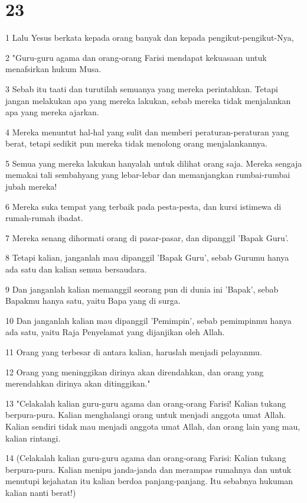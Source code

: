 \chapter{23}

\par 1 Lalu Yesus berkata kepada orang banyak dan kepada pengikut-pengikut-Nya,
\par 2 "Guru-guru agama dan orang-orang Farisi mendapat kekuasaan untuk menafsirkan hukum Musa.
\par 3 Sebab itu taati dan turutilah semuanya yang mereka perintahkan. Tetapi jangan melakukan apa yang mereka lakukan, sebab mereka tidak menjalankan apa yang mereka ajarkan.
\par 4 Mereka menuntut hal-hal yang sulit dan memberi peraturan-peraturan yang berat, tetapi sedikit pun mereka tidak menolong orang menjalankannya.
\par 5 Semua yang mereka lakukan hanyalah untuk dilihat orang saja. Mereka sengaja memakai tali sembahyang yang lebar-lebar dan memanjangkan rumbai-rumbai jubah mereka!
\par 6 Mereka suka tempat yang terbaik pada pesta-pesta, dan kursi istimewa di rumah-rumah ibadat.
\par 7 Mereka senang dihormati orang di pasar-pasar, dan dipanggil 'Bapak Guru'.
\par 8 Tetapi kalian, janganlah mau dipanggil 'Bapak Guru', sebab Gurumu hanya ada satu dan kalian semua bersaudara.
\par 9 Dan janganlah kalian memanggil seorang pun di dunia ini 'Bapak', sebab Bapakmu hanya satu, yaitu Bapa yang di surga.
\par 10 Dan janganlah kalian mau dipanggil 'Pemimpin', sebab pemimpinmu hanya ada satu, yaitu Raja Penyelamat yang dijanjikan oleh Allah.
\par 11 Orang yang terbesar di antara kalian, haruslah menjadi pelayanmu.
\par 12 Orang yang meninggikan dirinya akan direndahkan, dan orang yang merendahkan dirinya akan ditinggikan."
\par 13 "Celakalah kalian guru-guru agama dan orang-orang Farisi! Kalian tukang berpura-pura. Kalian menghalangi orang untuk menjadi anggota umat Allah. Kalian sendiri tidak mau menjadi anggota umat Allah, dan orang lain yang mau, kalian rintangi.
\par 14 (Celakalah kalian guru-guru agama dan orang-orang Farisi: Kalian tukang berpura-pura. Kalian menipu janda-janda dan merampas rumahnya dan untuk menutupi kejahatan itu kalian berdoa panjang-panjang. Itu sebabnya hukuman kalian nanti berat!)
